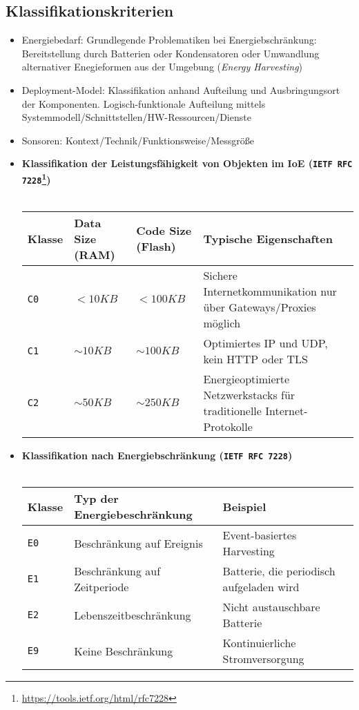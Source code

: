 \subsection{Klassifikationskriterien}
\begin{itemize}
	\item Energiebedarf: Grundlegende Problematiken bei Energiebschränkung: Bereitstellung durch Batterien oder Kondensatoren oder Umwandlung alternativer Enegieformen aus der Umgebung (\textit{Energy Harvesting})
	\item Deployment-Model: Klassifikation anhand Aufteilung und Ausbringungsort der Komponenten. Logisch-funktionale Aufteilung mittels Systemmodell/Schnittstellen/HW-Ressourcen/Dienste
	\item Sonsoren: Kontext/Technik/Funktionsweise/Messgröße
	\item \textbf{Klassifikation der Leistungsfähigkeit von Objekten im IoE (\texttt{IETF RFC 7228}\footnote{\url{https://tools.ietf.org/html/rfc7228}})}\\\\
	\begin{tabularx}{\linewidth}{l|l|l|X}
		\textbf{Klasse} & \textbf{Data Size (RAM)} & \textbf{Code Size (Flash)} & \textbf{Typische Eigenschaften} \\
		\hline
		\texttt{C0} & \(< 10 KB\) & \(< 100 KB\) & Sichere Internetkommunikation nur über Gateways/Proxies möglich \\
		\hline
		\texttt{C1} & \(\sim 10 KB\) & \(\sim 100 KB\) & Optimiertes IP und UDP, kein HTTP oder TLS \\
		\hline
		\texttt{C2} & \(\sim 50 KB\) & \(\sim 250 KB\) & Energieoptimierte Netzwerkstacks für traditionelle Internet-Protokolle \\
	\end{tabularx}
	\item \textbf{Klassifikation nach Energiebschränkung (\texttt{IETF RFC 7228})}\\\\
	\begin{tabularx}{\linewidth}{l|l|X}
		\textbf{Klasse} & \textbf{Typ der Energiebeschränkung} & \textbf{Beispiel}\\
		\hline
		\texttt{E0} & Beschränkung auf Ereignis & Event-basiertes Harvesting \\
		\hline
		\texttt{E1} & Beschränkung auf Zeitperiode & Batterie, die periodisch aufgeladen wird \\
		\hline
		\texttt{E2} & Lebenszeitbeschränkung & Nicht austauschbare Batterie \\
		\texttt{E9} & Keine Beschränkung & Kontinuierliche Stromversorgung \\
	\end{tabularx}
\end{itemize}



